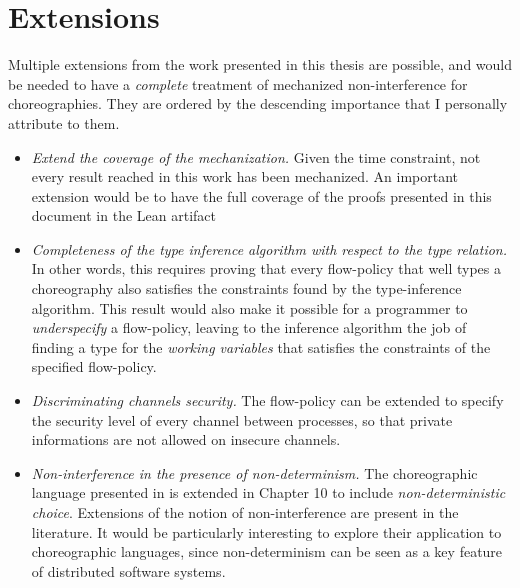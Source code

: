 \documentclass[12pt,a4paper,twoside]{book}
\begin{document}
\section{Extensions}
Multiple extensions from the work presented in this thesis are possible, and would be needed to have a \emph{complete} treatment of mechanized non-interference for choreographies. They are ordered by the descending importance that I personally attribute to them.
\begin{itemize}
\item \emph{Extend the coverage of the mechanization.} Given the time constraint, not every result reached in this work has been mechanized. An important extension would be to have the full coverage of the proofs presented in this document in the Lean artifact
\item \emph{Completeness of the type inference algorithm with respect to the type relation.} In other words, this requires proving that every flow-policy that well types a choreography also satisfies the constraints found by the type-inference algorithm. This result would also make it possible for a programmer to \emph{underspecify} a flow-policy, leaving to the inference algorithm the job of finding a type for the \emph{working variables} that satisfies the constraints of the specified flow-policy.
\item \emph{Discriminating channels security.} The flow-policy can be extended to specify the security level of every channel between processes, so that private informations are not allowed on insecure channels.
\item \emph{Non-interference in the presence of non-determinism.} The choreographic language presented in \cite{montesi2023introduction} is extended in Chapter 10 to include \emph{non-deterministic choice}. Extensions of the notion of non-interference are present in the literature\cite{sabelfeld2003language}. It would be particularly interesting to explore their application to choreographic languages, since non-determinism can be seen as a key feature of distributed software systems.
\end{itemize}
\end{document}
